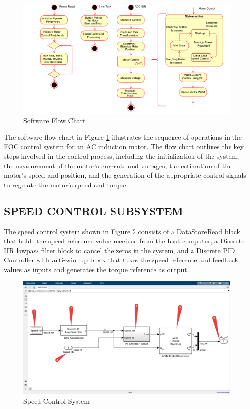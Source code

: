 \begin{figure}[H]
	\centering
	\includegraphics[width=6in]{sections/section3/images/softwareflowchart.png}
	\caption{Software Flow Chart}
	\label{fig:Software Flow Chart}
\end{figure}

The software flow chart in Figure \ref{fig:Software Flow Chart} illustrates the sequence of operations in the FOC control system for an AC induction motor. The flow chart outlines the key steps involved in the control process, including the initialization of the system, the measurement of the motor's currents and voltages, the estimation of the motor's speed and position, and the generation of the appropriate control signals to regulate the motor's speed and torque.


\subsection{SPEED CONTROL SUBSYSTEM}

The speed control system shown in Figure \ref{fig:speed_control_system} consists of a DataStoreRead block that holds the speed reference value received from the host computer, a Discrete IIR lowpass filter block to cancel the zeros in the system, and a Discrete PID Controller with anti-windup block that takes the speed reference and feedback values as inputs and generates the torque reference as output. 

\begin{figure}[H]
	\centering
	\includegraphics[width=5in]{sections/section3/images/simulation/speedControl/speedController.png}
	\caption{Speed Control System}
	\label{fig:speed_control_system}
\end{figure}


